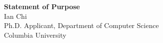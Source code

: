 \documentclass[11pt]{article}
\begin{document}
\begin{center}
    {\Large \textbf{Statement of Purpose}}\\[4pt]
    {\large Ian Chi}\\[2pt]
    Ph.D. Applicant, Department of Computer Science\\
    Columbia University
\end{center}

\vspace{1em}

\end{document}
